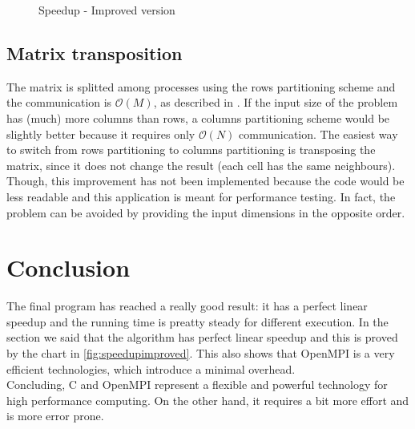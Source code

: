 \documentclass{article}
\begin{document}
\begin{figure}
\centering
{}
\caption{Speedup - Improved version}
\label{fig:speedupimproved}
\end{figure}


\subsection{Matrix transposition}
The matrix is splitted among processes using the rows partitioning scheme and the communication is $\mathcal{O}(M)$, as described in . If the input size of the problem has (much) more columns than rows, a columns partitioning scheme would be slightly better because it requires only $\mathcal{O}(N)$ communication. The easiest way to switch from rows partitioning to columns partitioning is transposing the matrix, since it does not change the result (each cell has the same neighbours). Though, this improvement has not been implemented because the code would be less readable and this application is meant for performance testing. In fact, the problem can be avoided by providing the input dimensions in the opposite order.

\section{Conclusion}
The final program has reached a really good result: it has a perfect linear speedup and the running time is preatty steady for different execution. In the section  we said that the algorithm has perfect linear speedup and this is proved by the chart in \autoref{fig:speedupimproved}. This also shows that OpenMPI is a very efficient technologies, which introduce a minimal overhead. \\
Concluding, C and OpenMPI represent a flexible and powerful technology for high performance computing. On the other hand, it requires a bit more effort and is more error prone.
\end{document}
